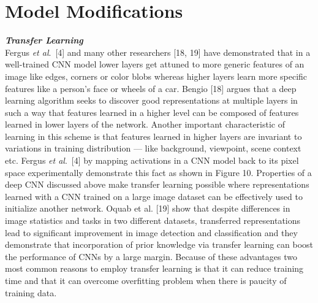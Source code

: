\documentclass [11pt,letterpaper ,twoside ,openany ]{report}
\begin{document}
    \section{Model Modifications}

    \noindent
    \textbf{\textit{Transfer Learning}}\\
    Fergus \textit {et al}.\ [4] and many other researchers [18, 19] have demonstrated that in a well-trained CNN model lower layers get attuned to more generic features of an image like edges, corners or color blobs whereas higher layers learn more specific features like a person's face or wheels of a car. Bengio [18] argues that a deep learning algorithm seeks to discover good representations at multiple layers  in such a way that features learned in a higher level can be composed of features learned in lower layers of the network. Another important characteristic of learning in this scheme is that features learned in higher layers are invariant to variations in training distribution --- like background, viewpoint, scene context etc. Fergus \textit{et al}.\ [4] by mapping activations in a CNN model back to its pixel space experimentally demonstrate this fact as shown in Figure 10. Properties of a deep CNN discussed above make transfer learning possible where representations learned with a CNN trained on a large image dataset can be effectively used to  initialize another network. Oquab et al. [19] show that despite differences in image statistics and tasks in two different datasets, transferred representations lead to significant improvement in image detection and classification and they demonstrate that incorporation of prior knowledge via transfer learning can boost the performance of CNNs by a large margin. Because of these advantages two most common reasons to employ transfer learning is that it can reduce training time and that it can overcome overfitting problem when there is paucity of training data.
\end{document}

